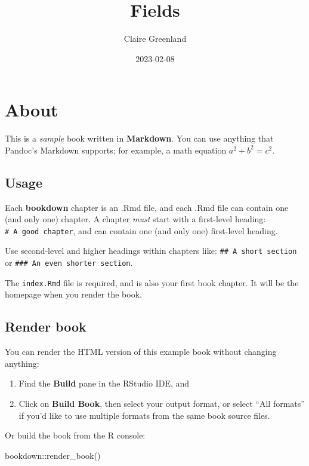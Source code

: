 \documentclass[
]{book}
\title{Fields}
\author{Claire Greenland}
\date{2023-02-08}
\newenvironment{Shaded}{\begin{snugshade}}{\end{snugshade}}
\newcommand{\FunctionTok}[1]{\textcolor[rgb]{0.00,0.00,0.00}{#1}}
\newcommand{\NormalTok}[1]{#1}
\newcommand{\SpecialCharTok}[1]{\textcolor[rgb]{0.00,0.00,0.00}{#1}}
\theoremstyle{definition}
\theoremstyle{definition}
\theoremstyle{definition}
\theoremstyle{definition}
\theoremstyle{remark}
\begin{document}
\maketitle

{
\setcounter{tocdepth}{1}
\tableofcontents
}
\hypertarget{about}{%
\chapter{About}\label{about}}

This is a \emph{sample} book written in \textbf{Markdown}. You can use anything that Pandoc's Markdown supports; for example, a math equation \(a^2 + b^2 = c^2\).

\hypertarget{usage}{%
\section{Usage}\label{usage}}

Each \textbf{bookdown} chapter is an .Rmd file, and each .Rmd file can contain one (and only one) chapter. A chapter \emph{must} start with a first-level heading: \texttt{\#\ A\ good\ chapter}, and can contain one (and only one) first-level heading.

Use second-level and higher headings within chapters like: \texttt{\#\#\ A\ short\ section} or \texttt{\#\#\#\ An\ even\ shorter\ section}.

The \texttt{index.Rmd} file is required, and is also your first book chapter. It will be the homepage when you render the book.

\hypertarget{render-book}{%
\section{Render book}\label{render-book}}

You can render the HTML version of this example book without changing anything:

\begin{enumerate}
\def\labelenumi{\arabic{enumi}.}
\item
  Find the \textbf{Build} pane in the RStudio IDE, and
\item
  Click on \textbf{Build Book}, then select your output format, or select ``All formats'' if you'd like to use multiple formats from the same book source files.
\end{enumerate}

Or build the book from the R console:

\begin{Shaded}
\begin{Highlighting}[]
\NormalTok{bookdown}\SpecialCharTok{::}\FunctionTok{render\_book}\NormalTok{()}
\end{Highlighting}
\end{Shaded}
\end{document}
